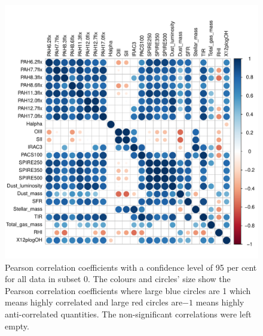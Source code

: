       \begin{figure}
                \centering
                \includegraphics[width=\textwidth]{../images0.01/cor_plots/M31_all_derived_ones_core_plot_for_paper.pdf}
            \caption{Pearson correlation coefficients with a confidence level of 95 per cent for all data in subset 0. The colours and circles' size show the Pearson correlation coefficients where large blue circles are 1 which means highly correlated and large red circles are$-1$ means highly anti-correlated quantities. The non-significant correlations were left empty.}
            \label{fig: cor_all}
        \end{figure}
 
